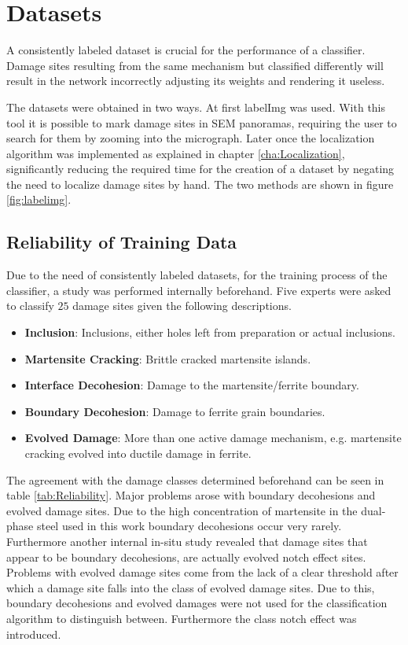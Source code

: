 \chapter{Datasets}

A consistently labeled dataset is crucial for the performance of a classifier. Damage sites resulting from the same mechanism but classified differently will result in the network incorrectly adjusting its weights and rendering it useless. 


The datasets were obtained in two ways. At first labelImg \cite{labelImg} was used. With this tool it is possible to mark damage sites in SEM panoramas, requiring the user to search for them by zooming into the micrograph. Later once the localization algorithm was implemented as explained in chapter \ref{cha:Localization}, significantly reducing the required time for the creation of a dataset by negating the need to localize damage sites by hand. The two methods are shown in figure \ref{fig:labelimg}. \\

\section{Reliability of Training Data}

Due to the need of consistently labeled datasets, for the training process of the classifier, a study was performed internally beforehand. Five experts were asked to classify $25$ damage sites given the following descriptions. 
\begin{itemize}[label={}]
\item \textbf{Inclusion}: Inclusions, either holes left from preparation or actual inclusions.
\item \textbf{Martensite Cracking}: Brittle cracked martensite islands.
\item \textbf{Interface Decohesion}: Damage to the martensite/ferrite boundary.
\item \textbf{Boundary Decohesion}: Damage to ferrite grain boundaries.
\item \textbf{Evolved Damage}: More than one active damage mechanism, e.g. martensite cracking evolved into ductile damage in ferrite.
\end{itemize}
The agreement with the damage classes determined beforehand can be seen in table \ref{tab:Reliability}. Major problems arose with boundary decohesions and evolved damage sites. Due to the high concentration of martensite in the dual-phase steel used in this work boundary decohesions occur very rarely. Furthermore another internal in-situ study revealed that damage sites that appear to be boundary decohesions, are actually evolved notch effect sites. Problems with evolved damage sites come from the lack of a clear threshold after which a damage site falls into the class of evolved damage sites. Due to this, boundary decohesions and evolved damages were not used for the classification algorithm to distinguish between. Furthermore the class notch effect was introduced. \\

